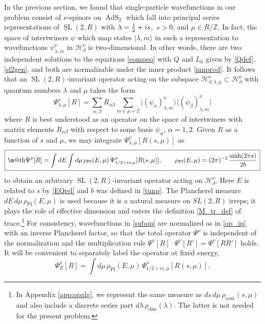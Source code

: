\documentclass[11pt]{article}
\makeatletter
\newcommand{\be}{\begin{equation}}
\newcommand{\ee}{\end{equation}}
\newcommand*{\wideboxed}[1]{\setlength{\fboxsep}{1ex}%
  \fbox{\m@th$\displaystyle#1$}}
\newcommand{\lt}{\left}
\newcommand{\rt}{\right}
\newcommand{\blangle}{\bigl\langle}
\newcommand{\brangle}{\bigr\rangle}
\newcommand*{\ket}[1]{|{#1}\rangle}
\newcommand*{\bbra}[1]{\blangle{#1}\big|}
\newcommand*{\bket}[1]{\big|{#1}\brangle}
\newcommand{\calH}{\mathcal{H}}
\newcommand{\ZZ}{\mathbb{Z}}
\newcommand{\RR}{\mathbb{R}}
\DeclareMathOperator{\SL}{SL}
\DeclareMathOperator{\tSL}{\widetilde{\mathrm{SL}}}
\DeclareMathOperator{\tAdS}{\widetilde{AdS}}
\newcommand{\rcont}{\rho_{\text{cont}}}
\newcommand{\rdisc}{\rho_{\text{disc}}}
\newcommand{\rPl}{\rho_{\text{Pl}}}
\newcommand{\al}{\alpha}
\newcommand{\lam}{\lambda}
\newcommand{\ov}{\over}
\newcommand{\p}{\partial}
\def\widetilde#1{#1}%
\def\SL{SL}
\def\RR{R}
\makeatother
\begin{document}
In the previous section, we found that single-particle wavefunctions in our problem consist of $\nu$-spinors on $\tAdS_2$ which fall into principal series representations of $\tSL(2,\RR)$ with $\lam={1 \ov 2}+i s$,\, $s>0$, and $\mu \in \RR/\ZZ$. In fact, the space of intertwiners $\psi$ which map states $\ket{\lam, m}$ in such a representation to wavefunctions $\psi^{\nu}_{\lam, m}$ in $\calH^{\nu}_{\p}$ is two-dimensional. In other words, there are two independent solutions to the equations \eqref{compeq} with $Q$ and $L_0$ given by \eqref{Qdef}, \eqref{sl2gen}, and both are normalizable under the inner product \eqref{innprod}. It follows that an $\tSL(2,\RR)$-invariant operator acting on the subspace $\calH^{\nu}_{\p; \lam, \mu}\subset \calH^{\nu}_{\p}$ with quantum numbers $\lam$ and $\mu$ takes the form
\be \label{subop}
\Psi^{\nu}_{\lam,\mu}[R]=\sum_{\alpha,\beta} R_{\alpha\beta} \sum_{m\in\mu+\ZZ}
\bket{\lt( \psi_{\alpha} \rt)^{\nu}_{\lambda,m}}
\bbra{\lt( \psi_{\beta} \rt)^{\nu}_{\lambda,m}}
\ee
where $R$ is best understood as an operator on the space of intertwiners with matrix elements $R_{\al\beta}$ with respect to some basis $\psi_{\al}$, $\al=1,2$. Given $R$ as a function of $s$ and $\mu$, we may integrate $\Psi^{\nu}_{\lam, \mu}[R(s,\mu)]$ as
\be \label{Mgenop}
\wideboxed{
\Psi^{\nu}[R]=\int dE \int d\mu\, \rPl(E, \mu)\, \Psi^{\nu}_{1/2+is,\mu}[R(s,\mu)], \qquad \rPl(E, \mu)=(2\pi)^{-2}\,{\sinh(2\pi s) \ov 2 b}}
\ee
to obtain an arbitrary $\tSL(2,\RR)$-invariant operator acting on $\calH^{\nu}_{\p}$. Here $E$ is related to $s$ by \eqref{EQrel} and $b$ was defined in \eqref{tunp}. The Plancherel measure $dE\,d\mu\,\rPl(E,\mu)$ is used because it is a natural measure on $\widetilde{\SL}(2,\RR)$ irreps; it plays the role of effective dimension and enters the definition \eqref{M_tr_def} of trace.\footnote{In Appendix \ref{app:opalg}, we represent the same measure as $ds\,d\mu\,\rcont(s,\mu)$ and also include a discrete series part $d\lambda\,\rdisc(\lambda)$. The latter is not needed for the present problem.} For consistency, wavefunctions in \eqref{subop} are normalized as in \eqref{op_ip} with an inverse Plancherel factor, so that the total operator $\Psi^{\nu}$ is independent of the normalization and the multiplication rule $\Psi^{\nu}[R]\cdot\Psi^{\nu}[R']=\Psi^{\nu}[RR']$ holds. It will be convenient to separately label the operator at fixed energy,
\begin{equation}\label{subop_E}
\Psi^{\nu}_E[R]=\int d\mu\, \rPl(E, \mu)\,\Psi^{\nu}_{1/2+is, \mu}[R(s,\mu)].
\end{equation}
\end{document}

